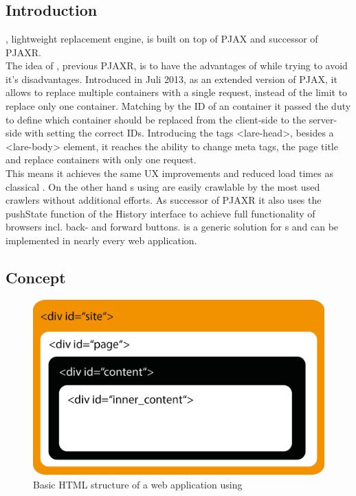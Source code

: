 \section{\lare{}\label{lare}}
\subsection{Introduction}
\lare{}, lightweight \ajax{} replacement engine, is built on top of PJAX and successor of PJAXR.
\\
The idea of \lare{}, previous PJAXR, is to have the advantages of \ajax{} while trying to avoid it's disadvantages.
Introduced in Juli 2013, as an extended version of PJAX, it allows to replace multiple containers with a single request, instead of the limit to replace only one container.
Matching by the ID of an container it passed the duty to define which container should be replaced from the client-side to the server-side with setting the correct IDs.
Introducing the tags <lare-head>, besides a <lare-body> element, it reaches the ability to change meta tags, the page title and replace containers with only one request.
\\
This means it achieves the same UX improvements and reduced load times as classical \ajax{}.
On the other hand \singlePageApplication{}s using \lare{} are easily crawlable by the most used crawlers without additional efforts.
As successor of PJAXR it also uses the pushState function of the History interface to achieve full functionality of browsers incl. back- and forward buttons.
\lare{} is a generic solution for \singlePageApplication{}s and can be implemented in nearly every web application.

\subsection{Concept}

\begin{figure}[H]
\centering
\includegraphics[width=13cm]{images/lare_html.png}
\caption[lare_html]{Basic HTML structure of a web application using \lare{}}
\label{fig:lare_html}
\end{figure}

